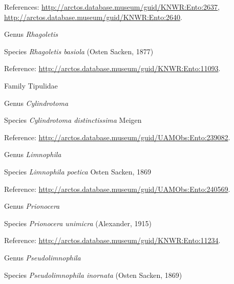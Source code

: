 \documentclass[9pt, article]{memoir}
\begin{document}
\begin{multicols}{2}
References: 
\url{http://arctos.database.museum/guid/KNWR:Ento:2637}, 
\url{http://arctos.database.museum/guid/KNWR:Ento:2640}.

\vspace{6pt}\noindent\hspace{30pt}Genus \textit{Rhagoletis}


\vspace{6pt}\noindent\hspace{36pt}Species \textit{Rhagoletis basiola} (Osten Sacken, 1877)


Reference: 
\url{http://arctos.database.museum/guid/KNWR:Ento:11093}.

\vspace{6pt}\noindent\hspace{24pt}Family Tipulidae


\vspace{6pt}\noindent\hspace{30pt}Genus \textit{Cylindrotoma}


\vspace{6pt}\noindent\hspace{36pt}Species \textit{Cylindrotoma distinctissima} Meigen


Reference: 
\url{http://arctos.database.museum/guid/UAMObs:Ento:239082}.

\vspace{6pt}\noindent\hspace{30pt}Genus \textit{Limnophila}


\vspace{6pt}\noindent\hspace{36pt}Species \textit{Limnophila poetica} Osten Sacken, 1869


Reference: 
\url{http://arctos.database.museum/guid/UAMObs:Ento:240569}.

\vspace{6pt}\noindent\hspace{30pt}Genus \textit{Prionocera}


\vspace{6pt}\noindent\hspace{36pt}Species \textit{Prionocera unimicra} (Alexander, 1915)


Reference: 
\url{http://arctos.database.museum/guid/KNWR:Ento:11234}.

\vspace{6pt}\noindent\hspace{30pt}Genus \textit{Pseudolimnophila}


\vspace{6pt}\noindent\hspace{36pt}Species \textit{Pseudolimnophila inornata} (Osten Sacken, 1869)



\end{multicols}
\end{document}
